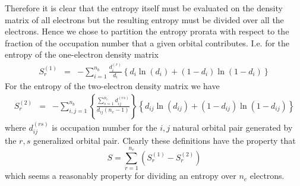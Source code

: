 \documentclass[pra]{revtex4-1}
\begin{document}
Therefore it is clear that the entropy itself must be evaluated on the density matrix
of all electrons but the resulting entropy must be divided over all the electrons.
Hence we chose to partition the entropy prorata with respect to the fraction of the
occupation number that a given orbital contributes. I.e. for the entropy of the 
one-electron density matrix
\begin{eqnarray}
   S^{(1)}_r &=& -\sum_{i=1}^{n_b}\frac{d_i^{(r)}}{d_i}
   \left\{d_i\ln(d_i)+(1-d_i)\ln(1-d_i)\right\}
   \label{Eq:entropy1part}
\end{eqnarray}
For the entropy of the two-electron density matrix we have
\begin{eqnarray}
   S^{(2)}_r &=& -\sum_{i,j=1}^{n_b}
           \left\{\frac{\sum_{s=1}^{n_e}d_{ij}^{(rs)}}{d_{ij}(n_e-1)}\right\}
           \left\{d_{ij}\ln(d_{ij})+(1-d_{ij})\ln(1-d_{ij})\right\}
   \label{Eq:entropy2part}
\end{eqnarray}
where $d_{ij}^{(rs)}$ is occupation number for the $i, j$ natural orbital pair
generated by the $r, s$ generalized orbital pair. Clearly these definitions have
the property that 
\begin{equation}
    S = \sum_{r=1}^{n_e}\left(S^{(1)}_r-S^{(2)}_r\right)
\end{equation}
which seems a reasonably property for dividing an entropy over $n_e$ electrons.
\end{document}
